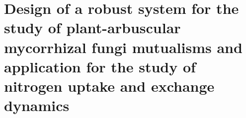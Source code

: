 \chapter{Design of a robust system for the study of plant-arbuscular mycorrhizal fungi mutualisms and application for the study of nitrogen uptake and exchange dynamics}
%
%
%
%
%
\makebibliographypage
%
%